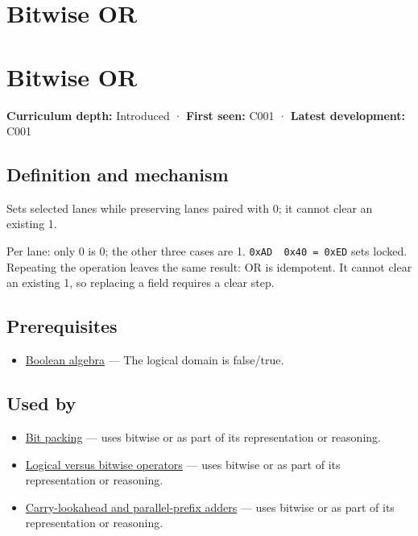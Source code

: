 \hypertarget{appendix-a427ce8ce8a6}{}
\section*{Bitwise OR}
\section{Bitwise OR}\label{appendix-a427ce8ce8a6-bitwise-or}

\textbf{Curriculum depth:} Introduced · \textbf{First seen:} C001 · \textbf{Latest development:} C001

\subsection{Definition and mechanism}\label{appendix-a427ce8ce8a6-definition-and-mechanism}

Sets selected lanes while preserving lanes paired with 0; it cannot clear an existing 1.

Per lane: only 0 is 0; the other three cases are 1. \texttt{0xAD\ \textbar{}\ 0x40\ =\ 0xED} sets locked. Repeating the operation leaves the same result: OR is idempotent. It cannot clear an existing 1, so replacing a field requires a clear step.

\subsection{Prerequisites}\label{appendix-a427ce8ce8a6-prerequisites}

\begin{itemize}
\tightlist
\item
  \hyperref[appendix-24475e1596a8]{Boolean algebra} --- The logical domain is false/true.
\end{itemize}

\subsection{Used by}\label{appendix-a427ce8ce8a6-used-by}

\begin{itemize}
\tightlist
\item
  \hyperref[appendix-1f9963e1a5d1]{Bit packing} --- uses bitwise or as part of its representation or reasoning.
\item
  \hyperref[appendix-fe6b457d68d8]{Logical versus bitwise operators} --- uses bitwise or as part of its representation or reasoning.
\item
  \hyperref[appendix-b5c46b2d94ff]{Carry-lookahead and parallel-prefix adders} --- uses bitwise or as part of its representation or reasoning.
\end{itemize}

